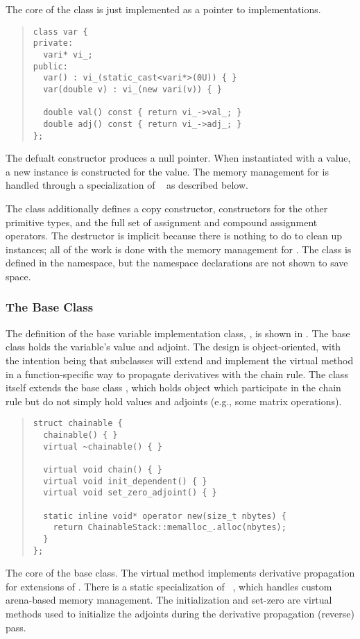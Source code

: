 \documentclass[10pt]{article}
\begin{document}
The core of the  class is just implemented as a
pointer to implementations.
%
\begin{quote}
\begin{Verbatim}
class var {
private:
  vari* vi_;
public:
  var() : vi_(static_cast<vari*>(0U)) { }
  var(double v) : vi_(new vari(v)) { }

  double val() const { return vi_->val_; }
  double adj() const { return vi_->adj_; }  
};
\end{Verbatim}
\end{quote}
%
The defualt constructor  produces a null pointer.  When
instantiated with a  value, a new  instance is
constructed for the value.  The memory management for  is
handled through a specialization of ~ as
described below.

The  class additionally defines a copy constructor,
constructors for the other primitive types, and the full set of
assignment and compound assignment operators.  The destructor is
implicit because there is nothing to do to clean up instances; all of
the work is done with the memory management for . The class
is defined in the  namespace, but the namespace
declarations are not shown to save
space.

\subsubsection{The  Base Class}

The definition of the base variable implementation class, ,
is shown in .  The base class holds the
variable's value and adjoint.  The design is object-oriented, with the
intention being that subclasses will extend  and implement the
virtual method  in a function-specific way to propagate
derivatives with the chain rule.  The class  itself extends
the base class , which holds object which participate
in the chain rule but do not simply hold values and adjoints (e.g.,
some matrix operations).

\begin{quote}
\begin{Verbatim}
struct chainable {
  chainable() { }
  virtual ~chainable() { }

  virtual void chain() { }
  virtual void init_dependent() { }
  virtual void set_zero_adjoint() { }

  static inline void* operator new(size_t nbytes) {
    return ChainableStack::memalloc_.alloc(nbytes);
  }
};
\end{Verbatim}
\end{quote}
%
The core of the  base class.  The virtual
method  implements derivative propagation for extensions
of .  There is a static specialization of
~, which handles custom arena-based memory
management.  The initialization and set-zero are virtual methods used
to initialize the adjoints during the derivative propagation (reverse)
pass.
\end{document}
